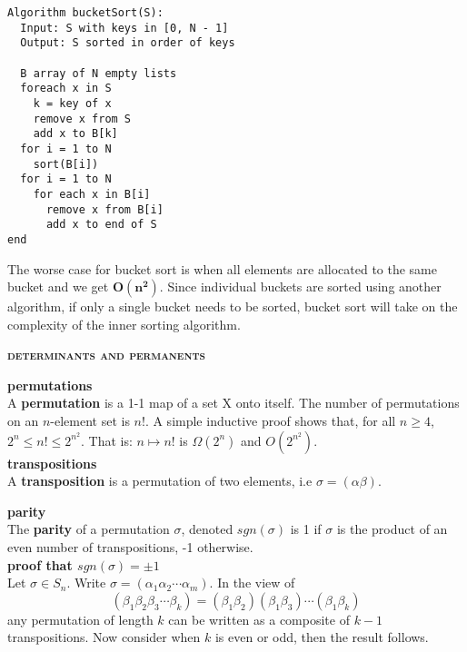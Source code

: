 \documentclass[a4paper]{article}
\begin{document}
\begin{multicols}{2}
\begin{framed}
\begin{lstlisting}
Algorithm bucketSort(S):
  Input: S with keys in [0, N - 1]
  Output: S sorted in order of keys

  B array of N empty lists
  foreach x in S
    k = key of x
    remove x from S
    add x to B[k]
  for i = 1 to N
    sort(B[i])
  for i = 1 to N
    for each x in B[i]
      remove x from B[i]
      add x to end of S
end
\end{lstlisting}
	
\noindent
The worse case for bucket sort is when all elements are allocated to the same bucket and we get $\bm{O(n^2)}$. Since individual buckets are sorted using another algorithm, if only a single bucket needs to be sorted, bucket sort will take on the complexity of the inner sorting algorithm.

\end{framed}

\newpage

\begin{framed}
	\begin{center}
		\textbf{\textsc{determinants and permanents}}
	\end{center}
	\textbf{permutations}\\
	A \textbf{permutation} is a 1-1 map of a set X onto itself. The number of permutations on an $n$-element set is $n!$. A simple inductive proof shows that, for all $n \geq 4$, $2^n \leq n! \leq 2^{n^2}$. That is: $n \mapsto n!$ is $\Omega(2^n)$ and $O(2^{n^2})$.\\
	
	\noindent
	\textbf{transpositions}\\
	A \textbf{transposition} is a permutation of two elements, i.e $\sigma = (\alpha\beta)$.
	
	\noindent
	\textbf{parity}\\
	The \textbf{parity} of a permutation $\sigma$, denoted $sgn(\sigma)$ is 1 if $\sigma$ is the product of an even number of transpositions, -1 otherwise.\\
	
	\noindent
	\textbf{proof that $sgn(\sigma) = \pm 1$}\\
	Let $\sigma \in S_n$. Write $\sigma = (\alpha_1 \alpha_2 \cdots \alpha_m)$. In the view of
	$$(\beta_1 \beta_2 \beta_3 \cdots \beta_k) = (\beta_1 \beta_2)(\beta_1 \beta_3) \cdots (\beta_1 \beta_k)$$
	any permutation of length $k$ can be written as a composite of $k - 1$ transpositions. Now consider when $k$ is even or odd, then the result follows.\\
	

\end{framed}
\end{multicols}
\end{document}

